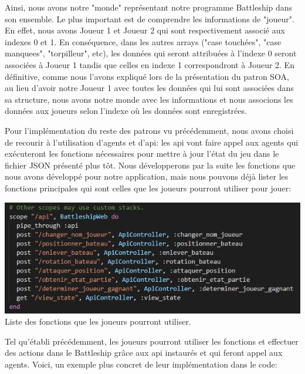 \documentclass[12pt]{article}
\begin{document}
Ainsi, nous avons notre "monde" représentant notre programme Battleship dans son ensemble. Le plus important est de comprendre les informations de "joueur". En effet, nous avons Joueur 1 et Joueur 2 qui sont respectivement associé aux indexes 0 et 1. En conséquence, dans les autres arrays ("case touchées", "case manquees", "torpilleur", etc), les données qui seront attribuées à l'indexe 0 seront associées à Joueur 1 tandis que celles en indexe 1 correspondront à Joueur 2.
En définitive, comme nous l'avons expliqué lors de la présentation du patron SOA, au lieu d'avoir notre Joueur 1 avec toutes les données qui lui sont associées dans sa structure, nous avons notre monde avec les informations et nous associons les données aux joueurs selon l'indexe où les données sont enregistrées.

Pour l'implémentation du reste des patrons vu précédemment, nous avons choisi de recourir à l'utilisation d'agents et d'api: les api vont faire appel aux agents qui exécuteront les fonctions nécessaires pour mettre à jour l'état du jeu dans le fichier JSON présenté plus tôt. Nous développerons par la suite les fonctions que nous avons développé pour notre application, mais nous pouvons déjà lister les fonctions principales qui sont celles que les joueurs pourront utiliser pour jouer:

\begin{center}
\includegraphics[scale = 0.75]{implementation-listeApi.PNG} \\
Liste des fonctions que les joueurs pourront utiliser.\cite{data_oriented_design}
\\[1.0 cm]
\end{center}

Tel qu'établi précédemment, les joueurs pourront utiliser les fonctions et effectuer des actions dans le Battleship grâce aux api instaurés et qui feront appel aux agents. Voici, un exemple plus concret de leur implémentation dans le code:
\end{document}
